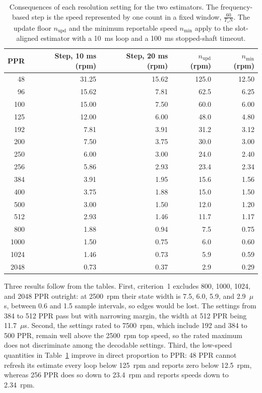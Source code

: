 \begin{table}[htbp]
    \centering
    \caption[All AMT102-V resolution settings: estimator consequences]{Consequences of each resolution setting for the two estimators. The frequency-based step is the speed represented by one count in a fixed window, $\frac{60}{T_s N}$. The update floor $n_{\text{upd}}$ and the minimum reportable speed $n_{\min}$ apply to the slot-aligned estimator with a 10~ms loop and a 100~ms stopped-shaft timeout.}
    \label{tab:ppr-est}
    \begin{tabular}{@{}rrrrr@{}}
        \toprule
        PPR & Step, 10 ms (rpm) & Step, 20 ms (rpm) & $n_{\text{upd}}$ (rpm) & $n_{\min}$ (rpm) \\
        \midrule
        48 & 31.25 & 15.62 & 125.0 & 12.50 \\
        96 & 15.62 & 7.81 & 62.5 & 6.25 \\
        100 & 15.00 & 7.50 & 60.0 & 6.00 \\
        125 & 12.00 & 6.00 & 48.0 & 4.80 \\
        192 & 7.81 & 3.91 & 31.2 & 3.12 \\
        200 & 7.50 & 3.75 & 30.0 & 3.00 \\
        250 & 6.00 & 3.00 & 24.0 & 2.40 \\
        256 & 5.86 & 2.93 & 23.4 & 2.34 \\
        384 & 3.91 & 1.95 & 15.6 & 1.56 \\
        400 & 3.75 & 1.88 & 15.0 & 1.50 \\
        500 & 3.00 & 1.50 & 12.0 & 1.20 \\
        512 & 2.93 & 1.46 & 11.7 & 1.17 \\
        800 & 1.88 & 0.94 & 7.5 & 0.75 \\
        1000 & 1.50 & 0.75 & 6.0 & 0.60 \\
        1024 & 1.46 & 0.73 & 5.9 & 0.59 \\
        2048 & 0.73 & 0.37 & 2.9 & 0.29 \\
        \bottomrule
    \end{tabular}
\end{table}

Three results follow from the tables. First, criterion~1 excludes 800, 1000, 1024, and 2048 PPR outright: at 2500~rpm their state width is 7.5, 6.0, 5.9, and 2.9~$\mu$s, between 0.6 and 1.5 sample intervals, so edges would be lost. The settings from 384 to 512 PPR pass but with narrowing margin, the width at 512 PPR being 11.7~$\mu$s. Second, the settings rated to 7500~rpm, which include 192 and 384 to 500 PPR, remain well above the 2500~rpm top speed, so the rated maximum does not discriminate among the decodable settings. Third, the low-speed quantities in Table~\ref{tab:ppr-est} improve in direct proportion to PPR: 48 PPR cannot refresh its estimate every loop below 125~rpm and reports zero below 12.5~rpm, whereas 256 PPR does so down to 23.4~rpm and reports speeds down to 2.34~rpm.

